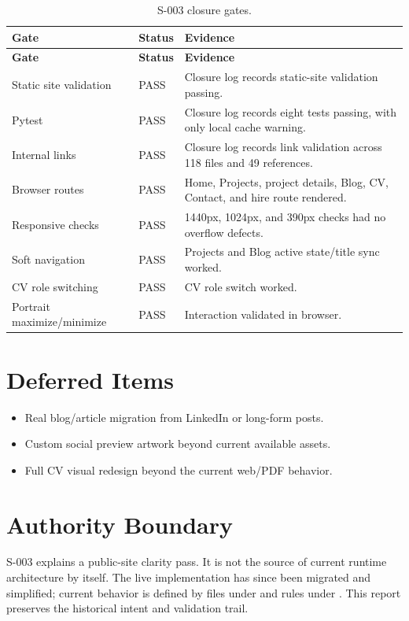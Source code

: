\documentclass[a4paper,11pt,openany]{report}
\begin{document}
\begin{longtable}{p{} p{} p{}}
\caption{S-003 closure gates.}\\
\toprule
\textbf{Gate} & \textbf{Status} & \textbf{Evidence} \\
\midrule
\endfirsthead
\toprule
\textbf{Gate} & \textbf{Status} & \textbf{Evidence} \\
\midrule
\endhead
Static site validation & PASS & Closure log records static-site validation passing. \\
Pytest & PASS & Closure log records eight tests passing, with only local cache warning. \\
Internal links & PASS & Closure log records link validation across 118 files and 49 references. \\
Browser routes & PASS & Home, Projects, project details, Blog, CV, Contact, and hire route rendered. \\
Responsive checks & PASS & 1440px, 1024px, and 390px checks had no overflow defects. \\
Soft navigation & PASS & Projects and Blog active state/title sync worked. \\
CV role switching & PASS & CV role switch worked. \\
Portrait maximize/minimize & PASS & Interaction validated in browser. \\
\bottomrule
\end{longtable}

\chapter{Deferred Items}

\begin{itemize}
  \item Real blog/article migration from LinkedIn or long-form posts.
  \item Custom social preview artwork beyond current available assets.
  \item Full CV visual redesign beyond the current web/PDF behavior.
\end{itemize}

\chapter{Authority Boundary}

S-003 explains a public-site clarity pass. It is not the source of current
runtime architecture by itself. The live implementation has since been migrated
and simplified; current behavior is defined by files under  and
rules under . This report preserves the historical
intent and validation trail.
\end{document}
